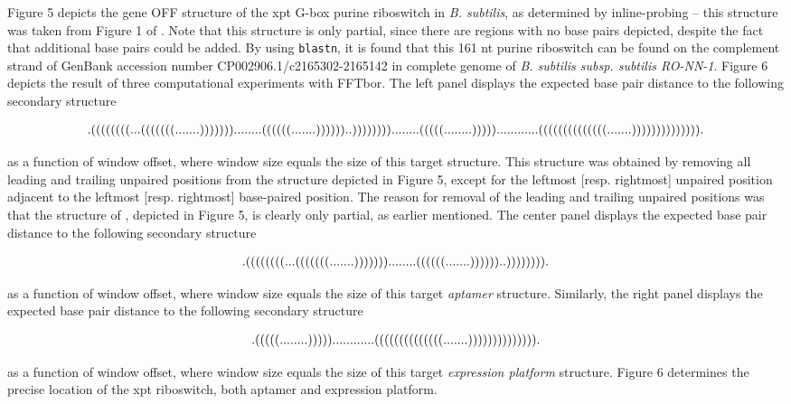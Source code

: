 Figure 5 depicts the gene OFF structure of the
xpt G-box purine riboswitch in {\em B. subtilis}, as determined by
inline-probing -- this structure was taken from
Figure 1 of \cite{breaker:Riboswitch2}.
Note that this structure is only partial, since there are regions
with no base pairs depicted, despite the fact that additional
base pairs could be added. By using
{\tt blastn}, it is found that this 161 nt purine riboswitch
can be found on the complement strand of GenBank accession number
CP002906.1/c2165302-2165142 in
complete genome of {\em B. subtilis subsp. subtilis RO-NN-1}.
Figure 6 depicts the result of
three computational experiments with FFTbor. The left panel displays
the expected base pair distance to the following secondary structure
\begin{small}
\begin{eqnarray}
\label{eq:xpt1}
\bf
.((((((((...(((((((.......)))))))........((((((.......))))))..))))))))........(((((........)))))............((((((((((((((.......)))))))))))))).
\end{eqnarray}
\end{small}
as a function of window offset, where window size equals the size of this
target structure. This structure was
obtained by removing all leading and trailing unpaired positions
from the structure depicted in Figure 5,
except for the leftmost [resp. rightmost] unpaired position
adjacent to the leftmost [resp. rightmost] base-paired position.
The reason for removal of the leading and trailing unpaired positions was
that the structure of \cite{breaker:Riboswitch2}, depicted in
Figure 5, is clearly only partial, as earlier
mentioned.  The center panel displays
the expected base pair distance to the following secondary structure
\begin{small}
\begin{eqnarray}
\label{eq:xpt2}
\bf
.((((((((...(((((((.......)))))))........((((((.......))))))..)))))))).
\end{eqnarray}
\end{small}
as a function of window offset, where window size equals the size of this
target {\em aptamer} structure. Similarly, the right panel displays
the expected base pair distance to the following secondary structure
\begin{small}
\begin{eqnarray}
\label{eq:xpt3}
\bf
.(((((........)))))............((((((((((((((.......)))))))))))))).
\end{eqnarray}
\end{small}
as a function of window offset, where window size equals the size of this
target {\em expression platform} structure.
Figure 6 determines the precise location of the
xpt riboswitch, both aptamer and expression platform.

